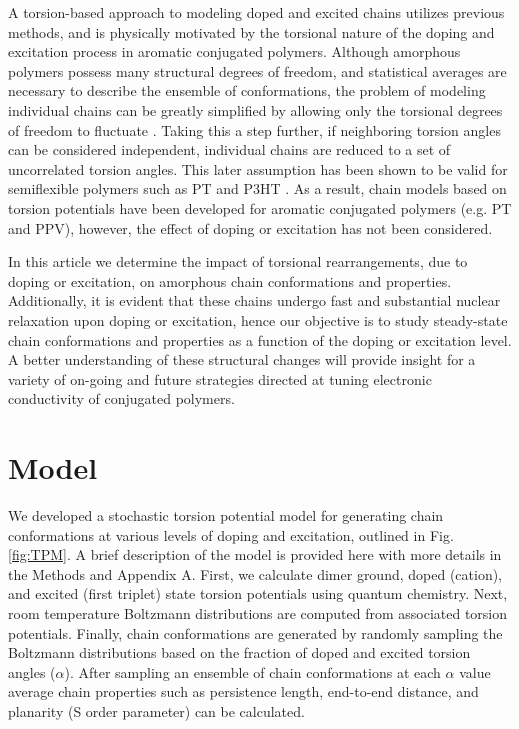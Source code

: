 A torsion-based approach to modeling doped and excited chains utilizes previous methods, and is physically motivated by the torsional nature of the doping and excitation process in aromatic conjugated polymers. Although amorphous polymers possess many structural degrees of freedom, and statistical averages are necessary to describe the ensemble of conformations, the problem of modeling individual chains can be greatly simplified by allowing only the torsional degrees of freedom to fluctuate \cite{Flory1989}. Taking this a step further, if neighboring torsion angles can be considered independent, individual chains are reduced to a set of uncorrelated torsion angles. This later assumption has been shown to be valid for semiflexible polymers such as PT and P3HT \cite{Westenhoff2006, Zhang2014}. As a result, chain models based on torsion potentials have been developed for aromatic conjugated polymers (e.g. PT and PPV),\cite{Zhang2014, Claudio2001} however, the effect of doping or excitation has not been considered.

In this article we determine the impact of torsional rearrangements, due to doping or excitation, on amorphous chain conformations and properties. Additionally, it is evident that these chains undergo fast and substantial nuclear relaxation upon doping or excitation,\cite{Zhou2015, Busby2011} hence our objective is to study steady-state chain conformations and properties as a function of the doping or excitation level. A better understanding of these structural changes will provide insight for a variety of on-going and future strategies directed at tuning electronic conductivity of conjugated polymers.

\section{Model}

We developed a stochastic torsion potential model for generating chain conformations at various levels of doping and excitation, outlined in Fig. \ref{fig:TPM}. A brief description of the model is provided here with more details in the Methods and Appendix A. First, we calculate dimer ground, doped (cation), and excited (first triplet) state torsion potentials using quantum chemistry. Next, room temperature Boltzmann distributions are computed from associated torsion potentials. Finally, chain conformations are generated by randomly sampling the Boltzmann distributions based on the fraction of doped and excited torsion angles ($\alpha$). After sampling an ensemble of chain conformations at each $\alpha$ value average chain properties such as persistence length, end-to-end distance, and planarity (S order parameter) can be calculated.

